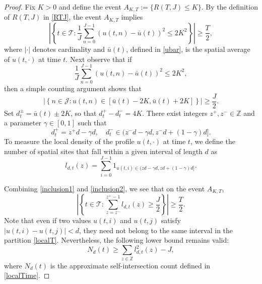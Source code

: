 \documentclass[10pt,a4paper]{amsart}
\newcommand{\Z}{\mathbb{Z}}
\begin{document}
\begin{proof}
Fix $K>0$ and define the event $A_{K,T}:=\{R(T,J)\leq K\}$. By the definition of $R(T,J)$ in \eqref{RTJ}, the event $A_{K,T}$ implies
\begin{equation}
\label{inclusion1}
    \left\vert \left\lbrace t\in \mathcal{T}:\frac{1}{J}\sum_{n=0}^{J-1}(u(t,n)-\bar{u}(t))^2\leq2K^2\right\rbrace\right\vert\geq \frac{T}{2},
\end{equation}
where $|\cdot|$ denotes cardinality and $\bar u(t)$, defined in \eqref{ubar}, is the spatial average of $u(t,\cdot)$ at time $t$. Next observe that if
\begin{equation*}
    \frac{1}{J}\sum_{n=0}^{J-1}(u(t,n)-\bar{u}(t))^2\leq2K^2,
\end{equation*}
then a simple counting argument shows that
\begin{equation}
    \label{inclusion2}
    \left\vert \left\lbrace n\in \mathcal{J}:u(t,n)\in[\bar{u}(t)-2K,\bar{u}(t)+2K]\right\rbrace\right\vert\geq \frac{J}{2}.
\end{equation}
Set $d_t^{\pm}=\bar{u}(t)\pm 2K$, so that $d_t^+-d_t^-=4K$. There exist integers $z^+,z^-\in\mathbb{Z}$ and a parameter $\gamma\in[0,1]$ such that
\begin{equation*}
    d_t^+=z^+d-\gamma d, \quad d_t^-\in(z^-d-\gamma d,z^-d+(1-\gamma)d].
\end{equation*}
To measure the local density of the profile $u(t,\cdot)$ at time $t$, we define the number of spatial sites that fall within a given interval of length $d$ as
\begin{equation}
\label{localT}
    l_{d,t}(z)=\sum_{i=0}^{J-1}1_{u(t,i)\in(zd-\gamma d,zd+(1-\gamma)d]}.
\end{equation}

Combining \eqref{inclusion1} and \eqref{inclusion2}, we see that on the event $A_{K,T}$,
\begin{equation}
\label{localbound}
    \left\vert \left\lbrace t\in \mathcal{T}:\sum_{z=z^-}^{z^+-1}l_{d,t}(z)\geq \frac{J}{2}\right\rbrace\right\vert\geq \frac{T}{2}.
\end{equation}
Note that even if two values $u(t,i)$ and $u(t,j)$ satisfy $\vert u(t,i)-u(t,j)\vert<d$, they need not belong to the same interval in the partition \eqref{localT}. Nevertheless, the following lower bound remains valid:
\begin{equation}
\label{localTineq}
    N_d(t)\geq\sum_{z\in\Z}l^2_{d,t}(z)-J,
\end{equation}
where $N_d(t)$ is the approximate self-intersection count defined in \eqref{localTime}.


\end{proof}
\end{document}
